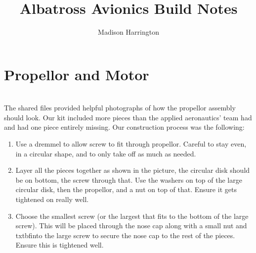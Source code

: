 \documentclass{article}
\begin{document}
\title{Albatross Avionics Build Notes}
\author{Madison Harrington}
\maketitle

\section{Propellor and Motor} \\

The shared files provided helpful photographs of how the propellor assembly should look. Our kit included more pieces than the applied aeronautics' team had and had one piece entirely missing. Our construction process was the following: 

\begin{enumerate}

\item Use a dremmel to allow screw to fit through propellor. Careful to stay even, in a circular shape, and to only take off as much as needed. 
\item Layer all the pieces together as shown in the picture, the circular disk should be on bottom, the screw through that. Use the washers
on top of the large circular disk, then the propellor, and a nut on top of that. Ensure it gets tightened on really well. 
\item Choose the smallest screw (or the largest that fits to the bottom of the large screw). This will be placed through the nose cap 
along with a small nut and txtbf{into the large screw} to secure the nose cap to the rest of the pieces. Ensure this is tightened well.

\end{enumerate}
\end{document}
